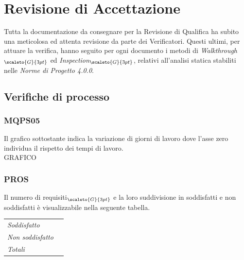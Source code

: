 {{{{{{{{{{{{{\section{Revisione di Accettazione}\label{ResocontoAttivitàDiVerificaRevisioneDiAccettazione}
Tutta la documentazione da consegnare per la Revisione di Qualifica ha subito una meticolosa ed attenta revisione da parte dei Verificatori. Questi ultimi, per attuare la verifica, hanno seguito per ogni documento i metodi di \textit{Walkthrough}$_{\scaleto{G}{3pt}}$ ed \textit{Inspection}$_{\scaleto{G}{3pt}}$, relativi all'analisi statica stabiliti nelle \textit{Norme di Progetto 4.0.0}.

\subsection{Verifiche di processo}\label{ResocontoAttivitàDiVerificaRevisioneDiAccettazioneVerificheDiProcesso}

\subsubsection{MQPS05}\label{ResocontoAttivitàDiVerificaRevisioneDiAccettazioneVerificheDiProcessoMPQS05}

Il grafico sottostante indica la variazione di giorni di lavoro dove l'asse zero individua il rispetto dei tempi di lavoro. \\
GRAFICO



\subsubsection{PROS}\label{ResocontoAttivitàDiVerificaRevisioneDiAccettazioneVerificheDiProcessoPROS}

Il numero di requisiti$_{\scaleto{G}{3pt}}$ e la loro suddivisione in soddisfatti e non soddisfatti è visualizzabile nella seguente tabella.

\quad
\def\tabularxcolumn#1{m{#1}}
{
	\begin{center}
		\renewcommand{\arraystretch}{1.4}
		\begin{longtable}[c]{|p{4cm}|p{3cm}|}
			\hline
			\rowcolor{airforceblue}
			\makecell[c]{\textbf{Realizzazione}} & \makecell[c]{\textbf{Quantità}}\\
			\hline
			\textit{Soddisfatto} & \makecell[c]{46}\\
			\hline
			\textit{Non soddisfatto} & \makecell[c]{0} \\
			\hline
			\textit{Totali} & \makecell[c]{46} \\
		\end{longtable}
	\end{center}
	
}}}}}}}}}}}}}}
